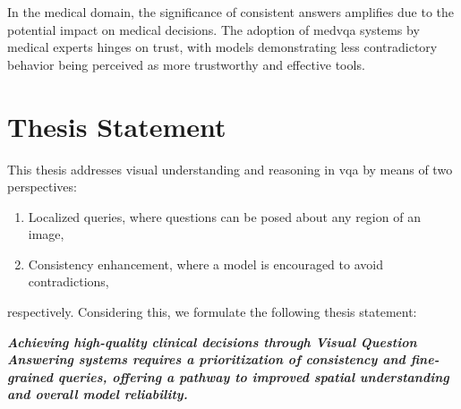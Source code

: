 In the medical domain, the significance of consistent answers amplifies due to the potential impact on medical decisions. The adoption of \gls{medvqa} systems by medical experts hinges on trust, with models demonstrating less contradictory behavior being perceived as more trustworthy and effective tools.


\section{Thesis Statement}

This thesis addresses visual understanding and reasoning in \gls{vqa} by means of two perspectives:

\begin{enumerate}
    \item Localized queries, where questions can be posed about any region of an image,
    \item Consistency enhancement, where a model is encouraged to avoid contradictions,
\end{enumerate}

respectively. Considering this, we formulate the following thesis statement:

\textit{\textbf{Achieving high-quality clinical decisions through Visual Question Answering systems requires a prioritization of consistency and fine-grained queries, offering a pathway to improved spatial understanding and overall model reliability.}}




